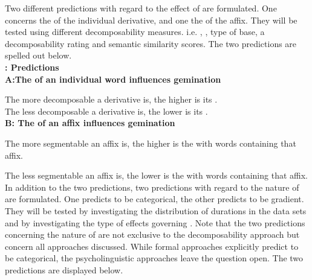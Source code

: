 {{Two different predictions with regard to the effect of  are formulated. One concerns the  of the individual derivative, and one the  of the affix. They will be tested using different decomposability measures. i.e.  , , type of base, a decomposability rating and semantic similarity scores. The two predictions are spelled out below.\\


\noindent \textbf{: Predictions}\\
 	

\noindent	\textbf{A:\hspace{0.5cm}The  of an individual word influences gemination} 
   
\noindent  The more decomposable a derivative is, the higher is its . \\

\noindent The less decomposable a derivative is, the lower is its . \\


	



\noindent	\textbf{B: \hspace{0.5cm}The  of an affix influences gemination} 
	
	
\noindent	The more segmentable an affix is, the higher is the  with words containing that affix. 
	
\noindent		The less segmentable an affix is, the lower is the  with words 
		containing that affix. \\
		
		

In addition to the two  predictions, two predictions with regard to the nature of  are formulated. One predicts  to be categorical, the other predicts  to be gradient. They will be tested by investigating the distribution of durations in the data sets and by investigating the type of effects governing . Note that the two predictions concerning the nature of  are not exclusive to the decomposability approach but concern all approaches discussed. While formal approaches explicitly predict  to be categorical, the psycholinguistic approaches leave the question open. The two predictions are displayed below.\\


}}
